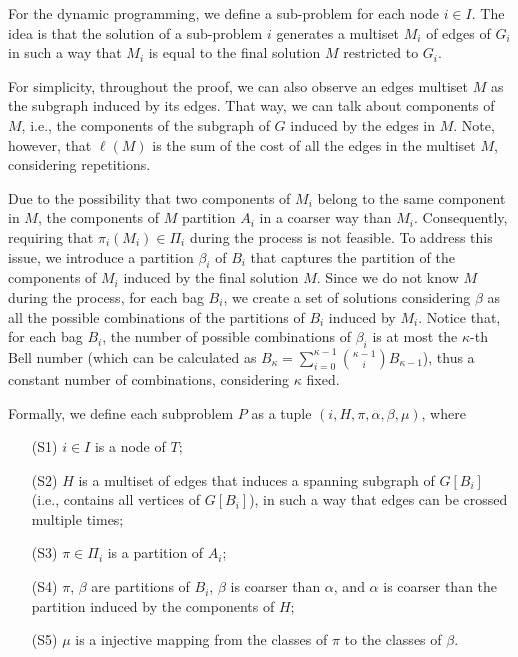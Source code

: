 For the dynamic programming, we define a sub-problem for each node \(i \in I\). The idea is that the solution of a sub-problem \(i\) generates a multiset \(M_i\) of edges of \(G_i\) in such a way that \(M_i\) is equal to the final solution \(M\) restricted to \(G_i\).

For simplicity, throughout the proof, we can also observe an edges multiset \(M\) as the subgraph induced by its edges. That way, we can talk about components of \(M\), i.e., the components of the subgraph of $G$ induced by the edges in \(M\). Note, however, that \(\ell(M)\) is the sum of the cost of all the edges in the multiset \(M\), considering repetitions.

Due to the possibility that two components of \(M_i\) belong to the same component in \(M\), the components of \(M\) partition \(A_i\) in a coarser way than \(M_i\). Consequently, requiring that \(\pi_i(M_i) \in \Pi_i\) during the process is not feasible. To address this issue, we introduce a partition \(\beta_i\) of \(B_i\) that captures the partition of the components of \(M_i\) induced by the final solution \(M\). Since we do not know \(M\) during the process, for each bag \(B_i\), we create a set of solutions considering \(\beta\) as all the possible combinations of the partitions of \(B_i\) induced by \(M_i\). Notice that, for each bag \(B_i\), the number of possible combinations of \(\beta_i\) is at most the \(\kappa\)-th Bell number (which can be calculated as \(B_{\kappa} = \sum_{i=0}^{\kappa - 1} \binom{\kappa - 1}{i} B_{\kappa - 1}\)), thus a constant number of combinations, considering \(\kappa\) fixed.

Formally, we define each subproblem \(P\) as a tuple \((i, H, \pi, \alpha, \beta, \mu)\), where 

\begin{itemize}
    \item[(S1)] \(i \in I\) is a node of \(T\);
    \item[(S2)] \(H\) is a multiset of edges that induces a spanning subgraph of \(G[B_i]\) (i.e., contains all vertices of \(G[B_i]\)), in such a way that edges can be crossed multiple times;
    \item[(S3)] \(\pi \in \Pi_i\) is a partition of \(A_i\);
    \item[(S4)] \(\pi\), \(\beta\) are partitions of \(B_i\), \(\beta\) is coarser than \(\alpha\), and \(\alpha\) is coarser than the partition induced by the components of \(H\);
    \item[(S5)] \(\mu\) is a injective mapping from the classes of \(\pi\) to the classes of \(\beta\).
\end{itemize}

